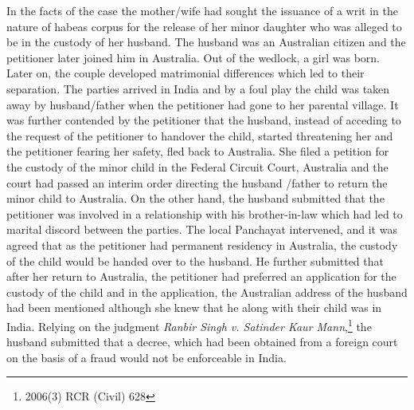 \begin{multicols}{2}
\noi
In the facts of the case the mother/wife had sought the issuance of a writ in the nature of habeas
corpus for the release of her minor daughter who was alleged to be in the custody of her husband.
The husband was an Australian citizen and the petitioner later joined him in Australia. Out of the
wedlock, a girl was born. Later on, the couple developed matrimonial differences which led to
their separation. The parties arrived in India and by a foul play the child was taken away by
husband/father when the petitioner had gone to her parental village. It was further contended by
the petitioner that the husband, instead of acceding to the request of the petitioner to handover the
child, started threatening her and the petitioner fearing her safety, fled back to Australia. She filed
a petition for the custody of the minor child in the Federal Circuit Court, Australia and the court
had passed an interim order directing the husband /father to return the minor child to Australia.
On the other hand, the husband submitted that the petitioner was involved in a relationship with 
his brother-in-law which had led to marital discord between the parties. The local Panchayat
intervened, and it was agreed that as the petitioner had permanent residency in Australia, the
custody of the child would be handed over to the husband. He further submitted that after her
return to Australia, the petitioner had preferred an application for the custody of the child and in
the application, the Australian address of the husband had been mentioned although she knew
that he along with their child was in India. Relying on the judgment \textit{Ranbir Singh v. Satinder
Kaur Mann},\footnote{2006(3) RCR (Civil) 628} the husband submitted that a decree, which had been obtained from a foreign court on the basis of a fraud would not be enforceable in India.


\end{multicols}
